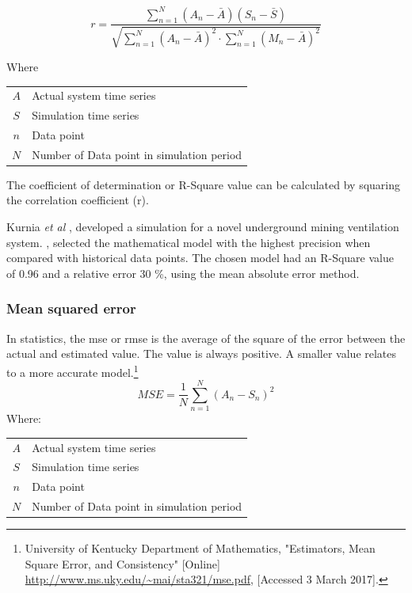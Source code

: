  		\begin{equation}
 		\label{eq: Correlation coefficient}
 		r = \dfrac{\sum_{n=1}^{N}(A_n - \bar{A})(S_n - \bar{S})}{\sqrt{\sum_{n=1}^{N}(A_n - \bar{A})^2 \cdot \sum_{n=1}^{N}(M_n - \bar{A})^2}}
 		\end{equation}
 		\par
 		Where \par
 		\begin{table}[h!]
 			\centering
 			\begin{tabular}{cl}
 				$A$ & Actual system time series \\
 				$S$ & Simulation time series \\
 				$n$ & Data point \\
 				$N$ & Number of Data point in simulation period \\
 			\end{tabular} 
 		\end{table}	
 		The coefficient of determination or R-Square value can be calculated by squaring the correlation coefficient (r). 
 		\par 
 			Kurnia \textit{et al} \cite{kurnia2014simulation}, \cite{kurnia2014dust} developed a simulation for a novel underground mining ventilation system. \cite{kurnia2014simulation}, \cite{kurnia2014dust} selected the mathematical model with the highest precision when compared with historical data points. The chosen model had an R-Square value of 0.96 and a relative error 30 \%, using the mean absolute error method. 
 			
 		\subsubsection{Mean squared error}	
 		In statistics, the \gls{mse} or \gls{rmse} is the average of the square of the error between the actual and estimated value. The value is always positive. A smaller value relates to a more accurate model.\footnote{University of Kentucky Department of Mathematics, "Estimators, Mean Square Error, and
 			Consistency" [Online] \url{http://www.ms.uky.edu/~mai/sta321/mse.pdf}, [Accessed 3 March 2017].}
 			\begin{equation}
 				\label{eq: rmse}
 				MSE = \dfrac{1}{N}\sum_{n=1}^{N}{(A_{n} - S_{n})^2}
 			\end{equation}
 			Where: \par
 			\begin{table}[h!]
 				\centering
 				\begin{tabular}{cl}
 					$A$ & Actual system time series \\
 					$S$ & Simulation time series \\
 					$n$ & Data point \\
 					$N$ & Number of Data point in simulation period \\
 			\end{tabular} 
 			\end{table}			

